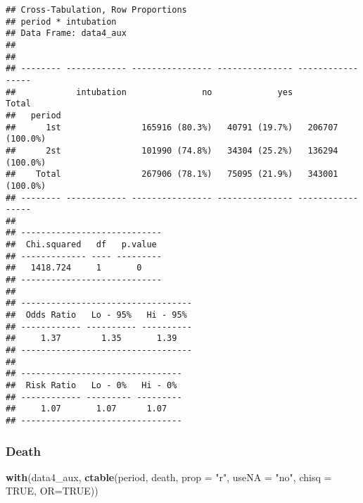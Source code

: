 \documentclass[
]{article}
\newenvironment{Shaded}{\begin{snugshade}}{\end{snugshade}}
\newcommand{\DataTypeTok}[1]{\textcolor[rgb]{0.13,0.29,0.53}{#1}}
\newcommand{\KeywordTok}[1]{\textcolor[rgb]{0.13,0.29,0.53}{\textbf{#1}}}
\newcommand{\NormalTok}[1]{#1}
\newcommand{\OtherTok}[1]{\textcolor[rgb]{0.56,0.35,0.01}{#1}}
\newcommand{\StringTok}[1]{\textcolor[rgb]{0.31,0.60,0.02}{#1}}
\begin{document}
\begin{verbatim}
## Cross-Tabulation, Row Proportions  
## period * intubation  
## Data Frame: data4_aux  
## 
## 
## -------- ------------ ---------------- --------------- -----------------
##            intubation               no             yes             Total
##   period                                                                
##      1st                165916 (80.3%)   40791 (19.7%)   206707 (100.0%)
##      2st                101990 (74.8%)   34304 (25.2%)   136294 (100.0%)
##    Total                267906 (78.1%)   75095 (21.9%)   343001 (100.0%)
## -------- ------------ ---------------- --------------- -----------------
## 
## ----------------------------
##  Chi.squared   df   p.value 
## ------------- ---- ---------
##   1418.724     1       0    
## ----------------------------
## 
## ----------------------------------
##  Odds Ratio   Lo - 95%   Hi - 95% 
## ------------ ---------- ----------
##     1.37        1.35       1.39   
## ----------------------------------
## 
## --------------------------------
##  Risk Ratio   Lo - 0%   Hi - 0% 
## ------------ --------- ---------
##     1.07       1.07      1.07   
## --------------------------------
\end{verbatim}

\hypertarget{death}{%
\subsubsection{Death}\label{death}}

\begin{Shaded}
\begin{Highlighting}[]
\KeywordTok{with}\NormalTok{(data4_aux, }\KeywordTok{ctable}\NormalTok{(period, death, }\DataTypeTok{prop =} \StringTok{"r"}\NormalTok{, }\DataTypeTok{useNA =} \StringTok{"no"}\NormalTok{, }\DataTypeTok{chisq =} \OtherTok{TRUE}\NormalTok{, }\DataTypeTok{OR=}\OtherTok{TRUE}\NormalTok{))}
\end{Highlighting}
\end{Shaded}
\end{document}
